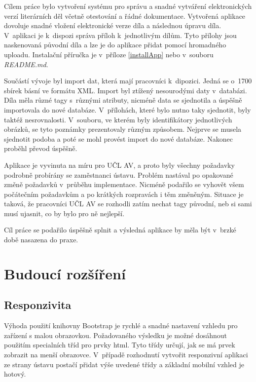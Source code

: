 \documentclass[thesis=B,czech]{FITthesis}[2012/06/26]
\begin{document}
\begin{conclusion}
    
	Cílem práce bylo vytvoření systému pro správu a snadné vytváření elektronických verzí literárních děl včetně otestování a řádné dokumentace. Vytvořená aplikace dovoluje snadné vložení elektronické verze díla a následnou úpravu díla. V~aplikaci je k~dispozi správa příloh k~jednotlivým dílům. Tyto přílohy jsou naskenovaná původní díla a lze je do aplikace přidat pomocí hromadného uploadu. Instalační příručka je v~příloze \ref{installApp} nebo v~souboru \textit{README.md}.
	
	Součástí vývoje byl import dat, která mají pracovníci k~dipozici. Jedná se o~1700 sbírek básní ve formátu XML. Import byl ztížený nesourodými daty v~databázi. Díla měla různé tagy s~různými atributy, nicméně data se sjednotila a úspěšně importovala do nové databáze. V~přílohách, které bylo nutno taky sjednotit, byly taktéž nesrovnalosti. V~souboru, ve kterém byly identifikátory jednotlivých obrázků, se tyto poznámky prezentovaly různým způsobem. Nejprve se musela sjednotit podoba a poté se mohl provést import do nové databáze. Nakonec proběhl převod úspěšně.
	
	Aplikace je vyvinuta na míru pro UČL AV, a proto byly všechny požadavky podrobně probírány se zaměstnanci ústavu. Problém nastával po opakované změně požadavků v~průběhu implementace. Nicméně podařilo se vyhovět všem počátečním požadavkům a po krátkých rozpravách i těm změněným. Situace je taková, že pracovníci UČL AV se rozhodli zatím nechat tagy původní, neb si sami musí ujasnit, co by bylo pro ně nejlepší.
	
	Cíl práce se podařilo úspěšně splnit a výsledná aplikace by měla být v~brzké době nasazena do praxe.
	
	\section{Budoucí rozšíření}
	
	    \subsection{Responzivita}
            Výhoda použití knihovny Bootstrap je rychlé a snadné nastavení vzhledu pro zařízení s malou obrazovkou. Požadovaného výsledku je možné dosáhnout použitím specialních tříd pro prvky html. Tyto třídy určují, jak se má prvek zobrazit na menší obrazovce. V~případě rozhodnutí vytvořit responzivní aplikaci ze strany ústavu postačí přidat výše uvedené třídy a základní mobilní vzhled je hotový.
        

\end{conclusion}
\end{document}
